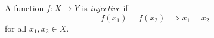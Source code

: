 
A function $f:X\to Y$ is \emph{injective} if
\[
f(x_1)=f(x_2)\implies x_1=x_2
\]
for all $x_1,x_2\in X$.
